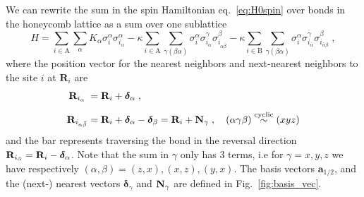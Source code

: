 We can rewrite the sum in the spin Hamiltonian eq.~\eqref{eq:H0spin} over bonds in the honeycomb lattice as a sum over one sublattice
\begin{equation}
    H =
    \sum_{i\in \mathrm{A}}\sum_{\alpha}  K_\alpha \sigma_i^\alpha\sigma_{i_\alpha}^\alpha
    - \kappa
    \sum_{i\in \mathrm{A}} \sum_{\gamma(\beta \alpha )}   \sigma_i^\alpha \sigma_{i_{\alpha}}^\gamma  \sigma_{i_{\alpha\bar{\beta}}}^\beta
     - \kappa
    \sum_{i\in \mathrm{B}} \sum_{\gamma(\beta \alpha )}   \sigma_i^\alpha \sigma_{i_{\bar{\alpha}}}^\gamma  \sigma_{i_{\bar{\alpha}{\beta}}}^\beta
    \; ,  \label{eq:2-kitaev}
\end{equation}
where the position vector for the nearest neighbors and next-nearest neighbors to the site $i$ at $\mathbf{R}_i$ are
\begin{align}
    \mb{R}_{i_\alpha\;} &= \mathbf{R}_i + \bm{\delta}_{\alpha} \; ,  \\[5pt]
    \mb{R}_{i_{\alpha\bar{\beta}}} &= \mathbf{R}_i + \bm{\delta}_{\alpha} -  \bm{\delta}_{\beta}  = \mathbf{R}_i + \mathbf{N}_{\gamma} \; , \quad (\alpha\gamma\beta)\overset{\scriptsize\text{cyclic}}\sim(xyz)
\end{align}
 and the bar represents traversing the bond in the reversal direction $\mb{R}_{i_{\bar{\alpha} }} = \mathbf{R}_i  -\bm{\delta}_{\alpha}$.
Note that the sum in $\gamma$ only has $3$ terms, i.e for $\gamma=x,y,z$ we have respectively $(\alpha,\beta)=(z,x),(x,z), (y,x)$.  The basis vectors $\mathbf{a}_{1/2}$, and the (next-) nearest vectors $\bm{\delta}_\gamma$ and $\mathbf{N}_\gamma$  are defined in Fig.~\ref{fig:basis_vec}.




